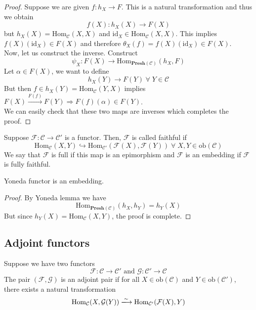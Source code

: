 \documentclass[oneside, 12pt]{scrbook}
\theoremstyle{theorem}
\begin{document}
\begin{proof}
Suppose we are given $f: h_{X} \rightarrow F$. This is a natural transformation and thus we obtain $$f(X): h_{X}(X) \rightarrow F(X)$$ but $h_{X}(X) = \mathrm{Hom}_{\mathcal{C}}(X,X)$ and $\mathrm{id}_{X} \in \mathrm{Hom}_{\mathcal{C}}(X,X)$. This implies $f(X)(\mathrm{id}_{X}) \in F(X)$ and therefore $\theta_{X}(f) = f(X)(\mathrm{id}_{X}) \in F(X)$. \\
Now, let us construct the inverse. Construct $$\psi_{X} : F(X) \rightarrow \mathrm{Hom}_{\mathbf{Presh}(\mathcal{C})}(h_{X}, F)$$ Let $\alpha \in F(X)$, we want to define $$h_{X}(Y) \rightarrow F(Y) \; \forall \; Y \in \mathcal{C}$$ But then $f \in h_{X}(Y)=\mathrm{Hom}_{\mathcal{C}}(Y,X)$ implies $F(X) \xrightarrow{F(f)} F(Y) \Rightarrow F(f)(\alpha) \in F(Y)$. \\
We can easily check that these two maps are inverses which completes the proof.
\end{proof}

Suppose $\mathcal{F}: \mathcal{C} \rightarrow \mathcal{C}'$ is a functor. Then, $\mathcal{F}$ is called faithful if $$\mathrm{Hom}_{\mathcal{C}}(X,Y) \hookrightarrow \mathrm{Hom}_{\mathcal{C}'} (\mathcal{F}(X), \mathcal{F}(Y)) \; \forall \; X,Y \in \mathrm{ob}(\mathcal{C})$$
We say that $\mathcal{F}$ is full if this map is an epimorphism and $\mathcal{F}$ is an embedding if $\mathcal{F}$ is fully faithful.

\begin{lemma}
Yoneda functor is an embedding.
\end{lemma}

\begin{proof}
By Yoneda lemma we have $$\mathrm{Hom}_{\mathbf{Presh}(\mathcal{C})}(h_{X}, h_{Y}) = h_{Y}(X)$$ But since $h_{Y}(X) = \mathrm{Hom}_{\mathcal{C}}(X,Y)$, the proof is complete.
\end{proof}

\subsection{Adjoint functors}

Suppose we have two functors $$\mathcal{F}: \mathcal{C} \rightarrow \mathcal{C}'  \text{ and } \mathcal{G}: \mathcal{C}' \rightarrow \mathcal{C}$$
The pair $(\mathcal{F}, \mathcal{G})$ is an adjoint pair if for all $X \in \mathrm{ob}(\mathcal{C})$ and $Y \in \mathrm{ob}(\mathcal{C}')$, there exists a natural transformation $$\mathrm{Hom}_{\mathcal{C}}(X, \mathcal{G}(Y)) \xlongrightarrow{\sim} \mathrm{Hom}_{\mathcal{C}'}(\mathcal{F}(X),Y)$$
\end{document}
